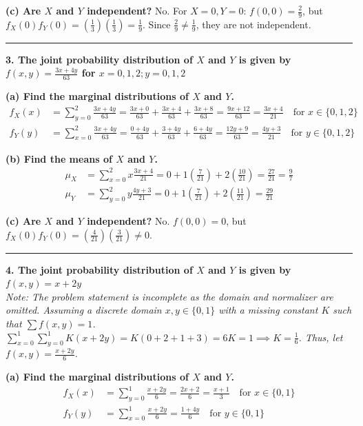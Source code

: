 \documentclass{article}
\begin{document}
\textbf{(c) Are $X$ and $Y$ independent?}
No. For $X=0, Y=0$: $f(0,0) = \frac{2}{9}$, but $f_X(0)f_Y(0) = \left(\frac{1}{3}\right)\left(\frac{1}{3}\right) = \frac{1}{9}$. Since $\frac{2}{9} \neq \frac{1}{9}$, they are not independent.

\vspace{1em}
\hrule
\vspace{1em}

\textbf{3. The joint probability distribution of $X$ and $Y$ is given by $f(x,y) = \frac{3x+4y}{63}$ for $x = 0,1,2; y = 0,1,2$}

\textbf{(a) Find the marginal distributions of $X$ and $Y$.}
\begin{align*}
f_X(x) &= \sum_{y=0}^{2} \frac{3x+4y}{63} = \frac{3x+0}{63} + \frac{3x+4}{63} + \frac{3x+8}{63} = \frac{9x+12}{63} = \frac{3x+4}{21} \quad \text{for } x \in \{0,1,2\} \\
f_Y(y) &= \sum_{x=0}^{2} \frac{3x+4y}{63} = \frac{0+4y}{63} + \frac{3+4y}{63} + \frac{6+4y}{63} = \frac{12y+9}{63} = \frac{4y+3}{21} \quad \text{for } y \in \{0,1,2\}
\end{align*}

\textbf{(b) Find the means of $X$ and $Y$.}
\begin{align*}
\mu_X &= \sum_{x=0}^{2} x \frac{3x+4}{21} = 0 + 1\left(\frac{7}{21}\right) + 2\left(\frac{10}{21}\right) = \frac{27}{21} = \frac{9}{7} \\
\mu_Y &= \sum_{y=0}^{2} y \frac{4y+3}{21} = 0 + 1\left(\frac{7}{21}\right) + 2\left(\frac{11}{21}\right) = \frac{29}{21}
\end{align*}

\textbf{(c) Are $X$ and $Y$ independent?}
No. $f(0,0) = 0$, but $f_X(0)f_Y(0) = \left(\frac{4}{21}\right)\left(\frac{3}{21}\right) \neq 0$.

\vspace{1em}
\hrule
\vspace{1em}

\textbf{4. The joint probability distribution of $X$ and $Y$ is given by $f(x,y) = x+2y$} \\
\textit{Note: The problem statement is incomplete as the domain and normalizer are omitted. Assuming a discrete domain $x, y \in \{0, 1\}$ with a missing constant $K$ such that $\sum f(x,y) = 1$. $\sum_{x=0}^1 \sum_{y=0}^1 K(x+2y) = K(0 + 2 + 1 + 3) = 6K = 1 \implies K = \frac{1}{6}$. Thus, let $f(x,y) = \frac{x+2y}{6}$.}

\textbf{(a) Find the marginal distributions of $X$ and $Y$.}
\begin{align*}
f_X(x) &= \sum_{y=0}^{1} \frac{x+2y}{6} = \frac{2x+2}{6} = \frac{x+1}{3} \quad \text{for } x \in \{0,1\} \\
f_Y(y) &= \sum_{x=0}^{1} \frac{x+2y}{6} = \frac{1+4y}{6} \quad \text{for } y \in \{0,1\}
\end{align*}
\end{document}
